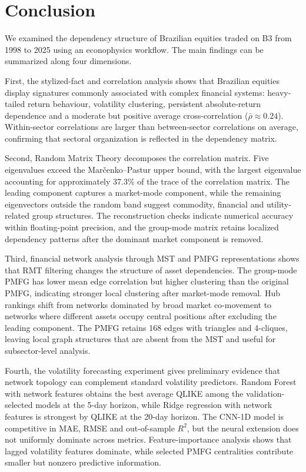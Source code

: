 \section{Conclusion}
\label{sec:conclusion}

We examined the dependency structure of Brazilian equities traded on B3 from 1998 to 2025 using an econophysics workflow. The main findings can be summarized along four dimensions.

First, the stylized-fact and correlation analysis shows that Brazilian equities display signatures commonly associated with complex financial systems: heavy-tailed return behaviour, volatility clustering, persistent absolute-return dependence and a moderate but positive average cross-correlation ($\bar{\rho}\approx0.24$). Within-sector correlations are larger than between-sector correlations on average, confirming that sectoral organization is reflected in the dependency matrix.

Second, Random Matrix Theory decomposes the correlation matrix. Five eigenvalues exceed the Mar\v{c}enko--Pastur upper bound, with the largest eigenvalue accounting for approximately 37.3\% of the trace of the correlation matrix. The leading component captures a market-mode component, while the remaining eigenvectors outside the random band suggest commodity, financial and utility-related group structures. The reconstruction checks indicate numerical accuracy within floating-point precision, and the group-mode matrix retains localized dependency patterns after the dominant market component is removed.

Third, financial network analysis through MST and PMFG representations shows that RMT filtering changes the structure of asset dependencies. The group-mode PMFG has lower mean edge correlation but higher clustering than the original PMFG, indicating stronger local clustering after market-mode removal. Hub rankings shift from networks dominated by broad market co-movement to networks where different assets occupy central positions after excluding the leading component. The PMFG retains 168 edges with triangles and 4-cliques, leaving local graph structures that are absent from the MST and useful for subsector-level analysis.

Fourth, the volatility forecasting experiment gives preliminary evidence that network topology can complement standard volatility predictors. Random Forest with network features obtains the best average QLIKE among the validation-selected models at the 5-day horizon, while Ridge regression with network features is strongest by QLIKE at the 20-day horizon. The CNN-1D model is competitive in MAE, RMSE and out-of-sample $R^2$, but the neural extension does not uniformly dominate across metrics. Feature-importance analysis shows that lagged volatility features dominate, while selected PMFG centralities contribute smaller but nonzero predictive information.

